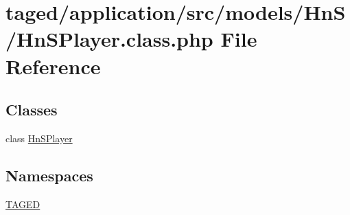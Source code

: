 \hypertarget{_hn_s_player_8class_8php}{}\section{taged/application/src/models/\+Hn\+S/\+Hn\+S\+Player.class.\+php File Reference}
\label{_hn_s_player_8class_8php}
\subsection*{Classes}
\begin{DoxyCompactItemize}
\item 
class \hyperlink{class_hn_s_player}{Hn\+S\+Player}
\end{DoxyCompactItemize}
\subsection*{Namespaces}
\begin{DoxyCompactItemize}
\item 
 \hyperlink{namespace_t_a_g_e_d}{T\+A\+G\+ED}
\end{DoxyCompactItemize}
